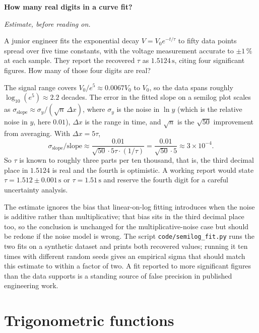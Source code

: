 \begin{estimation}
\textbf{How many real digits in a curve fit?}

\smallskip
\textit{Estimate, before reading on.}

\smallskip
A junior engineer fits the exponential decay $V = V_{0} e^{-t/\tau}$
to fifty data points spread over five time constants, with the
voltage measurement accurate to $\pm 1\,\%$ at each sample. They
report the recovered $\tau$ as $1.5124\,\si{\second}$, citing four
significant figures. How many of those four digits are real?

The signal range covers $V_{0}/e^{5} \approx 0.0067 V_{0}$ to
$V_{0}$, so the data spans roughly $\log_{10}(e^{5}) \approx 2.2$
decades. The error in the fitted slope on a semilog plot scales as
$\sigma_{\text{slope}} \approx \sigma_{y}/(\sqrt{n}\,\Delta x)$,
where $\sigma_{y}$ is the noise in $\ln y$ (which is the relative
noise in $y$, here $0.01$), $\Delta x$ is the range in time, and
$\sqrt{n}$ is the $\sqrt{50}$ improvement from averaging. With
$\Delta x = 5\tau$,
\[
  \sigma_{\text{slope}}/\text{slope}
  \approx \frac{0.01}{\sqrt{50} \cdot 5\tau \cdot (1/\tau)}
  = \frac{0.01}{\sqrt{50} \cdot 5}
  \approx 3 \times 10^{-4}.
\]
So $\tau$ is known to roughly three parts per ten thousand, that is,
the third decimal place in $1.5124$ is real and the fourth is
optimistic. A working report would state $\tau = 1.512 \pm 0.001\,
\si{\second}$ or $\tau = 1.51\,\si{\second}$ and reserve the fourth
digit for a careful uncertainty analysis.

The estimate ignores the bias that linear-on-log fitting introduces
when the noise is additive rather than multiplicative; that bias
sits in the third decimal place too, so the conclusion is unchanged
for the multiplicative-noise case but should be redone if the noise
model is wrong. The script
\texttt{code/semilog\_fit.py} runs the two fits on a synthetic
dataset and prints both recovered values; running it ten times with
different random seeds gives an empirical sigma that should match
this estimate to within a factor of two. A fit reported to more
significant figures than the data supports is a standing source of
false precision in published engineering work.
\end{estimation}

\section{Trigonometric functions}

